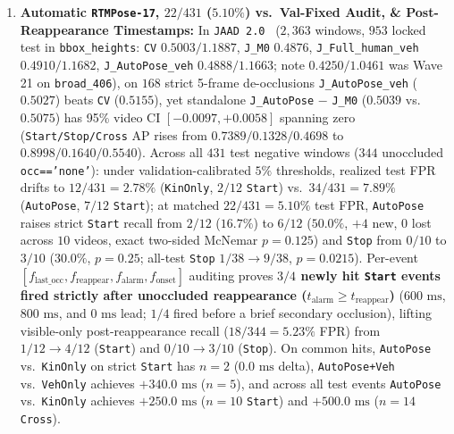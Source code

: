 \documentclass[journal]{IEEEtran}
\begin{document}
\begin{enumerate}
explicit emerging maneuvers (whereas $-2.17\text{ cm}$ was on $107$ geometry-rule maneuvers and unmasked Wave-24 $72$ visual maneuvers scored $-0.50\text{ cm}$ null; post-onset error measures post-maneuver trajectory accuracy rather than pre-onset alarm timing). Across 5 seeds, \texttt{Start/Stop} 6-slot generation is $100\%$ ($9.0/9, 18.0/18$; Rank-1 $0.0/9, 1.8/18$). On \texttt{JRDB} ($5{,}836$ windows), \texttt{S6\_M2b} ($0.2772 / 0.5357\text{ m}$) achieves the lowest $\text{ADE}_1$ (\texttt{S6\_Full} $0.2786$, \texttt{CondMedoid} $0.2803 / 0.5422\text{ m}$, \texttt{CV} $0.2812\text{ m}$); on \texttt{JTA-228} ($1{,}267$ test), $2$ steps ($2.5\text{ Hz}$) of 2D screen keypoints ($0.90$ fixed conf) + clip-initial ($\le 25$-frame) ground Jacobian yield $0.5564 / 1.1214\text{ m}$ vs.\ \texttt{M0} $0.5602\text{ m}$.
  \item \textbf{Automatic \texttt{RTMPose-17}, $22/431$ ($5.10\%$) vs.\ Val-Fixed Audit, \& Post-Reappearance Timestamps:} In \texttt{JAAD 2.0}~\cite{kotseruba2017jaad} ($2{,}363$ windows, $953$ locked test in \texttt{bbox\_heights}: \texttt{CV} $0.5003 / 1.1887$, \texttt{J\_M0} $0.4876$, \texttt{J\_Full\_human\_veh} $0.4910 / 1.1682$, \texttt{J\_AutoPose\_veh} $0.4888 / 1.1663$; note $0.4250 / 1.0461$ was Wave 21 on \texttt{broad\_406}), on $168$ strict 5-frame de-occlusions \texttt{J\_AutoPose\_veh} ($0.5027$) beats \texttt{CV} ($0.5155$), yet standalone \texttt{J\_AutoPose} $-$ \texttt{J\_M0} ($0.5039$ vs.\ $0.5075$) has 95\% video CI $[-0.0097, +0.0058]$ spanning zero (\texttt{Start/Stop/Cross} AP rises from $0.7389/0.1328/0.4698$ to $0.8998/0.1640/0.5540$). Across all $431$ test negative windows ($344$ unoccluded \texttt{occ=='none'}): under validation-calibrated $5\%$ thresholds, realized test FPR drifts to $12/431 = 2.78\%$ (\texttt{KinOnly}, $2/12$ \texttt{Start}) vs.\ $34/431 = 7.89\%$ (\texttt{AutoPose}, $7/12$ \texttt{Start}); at matched $22/431 = 5.10\%$ test FPR, \texttt{AutoPose} raises strict \texttt{Start} recall from $2/12$ ($16.7\%$) to $6/12$ ($50.0\%$, $+4$ new, $0$ lost across $10$ videos, exact two-sided McNemar $p = 0.125$) and \texttt{Stop} from $0/10$ to $3/10$ ($30.0\%$, $p = 0.25$; all-test \texttt{Stop} $1/38 \to 9/38$, $p = 0.0215$). Per-event $[f_{\text{last\_occ}}, f_{\text{reappear}}, f_{\text{alarm}}, f_{\text{onset}}]$ auditing proves \textbf{$3/4$ newly hit \texttt{Start} events fired strictly after unoccluded reappearance ($t_{\text{alarm}} \ge t_{\text{reappear}}$)} ($600\text{ ms}$, $800\text{ ms}$, and $0\text{ ms}$ lead; $1/4$ fired before a brief secondary occlusion), lifting visible-only post-reappearance recall ($18/344 = 5.23\%$ FPR) from $1/12 \to 4/12$ (\texttt{Start}) and $0/10 \to 3/10$ (\texttt{Stop}). On common hits, \texttt{AutoPose} vs.\ \texttt{KinOnly} on strict \texttt{Start} has $n=2$ ($0.0\text{ ms}$ delta), \texttt{AutoPose+Veh} vs.\ \texttt{VehOnly} achieves $+340.0\text{ ms}$ ($n=5$), and across all test events \texttt{AutoPose} vs.\ \texttt{KinOnly} achieves $+250.0\text{ ms}$ ($n=10$ \texttt{Start}) and $+500.0\text{ ms}$ ($n=14$ \texttt{Cross}).

\end{enumerate}
\end{document}
